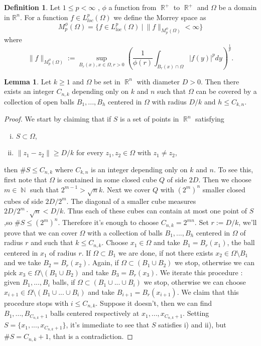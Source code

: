 \documentclass[12pt]{article}
\theoremstyle{definition}
\newtheorem{definition}{Definition}
\newtheorem{lemma}{Lemma}
\DeclareMathOperator\rr{\mathbb{R}}
\DeclareMathOperator\nn{\mathbb{N}}
\begin{document}
\begin{definition}
Let $1\le p< \infty$ , $\phi$ a function from $\rr^+$ to $\rr^+$ and $\Omega$ be a domain in $\mathbb{R}^n$. For a function $f \in L^p_{loc}(\Omega)$ we define the Morrey space as
\[ M_p^\phi(\Omega)=\{f \in  L^p_{loc}(\Omega) \ |\  \|f\|_{M_p^\phi(\Omega)}<\infty\}\]
where
\[ \|f\|_{M_p^\phi(\Omega)}:=\sup_{B_r(x), x \in \Omega,r>0} \left(  \frac{1}{\phi(r)}\int_{B_r(x)\cap \Omega} |f(y)|^p dy \right )^{\frac{1}{p}}.\]

\end{definition}
\begin{lemma}\label{covering}
Let $k\ge 1$ and $\Omega$ be set in $\rr^n$ with diameter $D>0$. Then there exists an integer $C_{n,k}$ depending only on $k$ and $n$ such that $\Omega$ can be covered by a collection of open balls $B_1,...,B_h$ centered in $\Omega$ with radius $D/k$ and $h \le C_{k,n}.$
\end{lemma}
\begin{proof}
We start by claiming that if $S$ is a set of points in $\rr^n$ satisfying
\begin{enumerate}[i)]
\item  	$S \subset \Omega$,
\item $\|z_1-z_2 \|\ge D/k$ for every $z_1,z_2 \in \Omega$ with $z_1 \neq z_2$,
\end{enumerate}
then $\#S\le C_{n,k}$ where $C_{k,n}$ is an integer depending only on $k$ and $n$. To see this, first note that $\Omega$ is contained in some closed cube $Q$ of side $2D$. Then we choose $m \in \nn$ such that $2^{m-1}>\sqrt n k$. Next we cover $Q$ with $(2^m)^n$ smaller closed cubes of side $2D/2^m$. The diagonal of a smaller cube measures $2D/2^m \cdot \sqrt n < D/k$. Thus each of these cubes can contain at most one point of $S$ ,so $\#S\le (2^m)^n.$ Therefore it's enough to choose $C_{n,k}=2^{mn}.$ Set $r:=D/k$, we'll prove that we can cover $\Omega$ with a collection of balls $B_1,...,B_h$ centered in $\Omega$ of radius $r$ and such that $k\le C_{n,k}.$ Choose $x_1 \in \Omega$ and take $B_1=B_r(x_1)$, the ball centered in $x_1$ of radius $r$. If $\Omega \subset B_1$ we are done, if not there exists $x_2 \in \Omega\setminus B_1$ and we take $B_2=B_r(x_2).$ Again, if $\Omega \subset (B_1\cup B_2)$ we stop, otherwise we can pick $x_3 \in  \Omega\setminus (B_1 \cup B_2)$ and take $B_3=B_r(x_3).$ We iterate this procedure : given $B_1,...,B_i$ balls, if $ \Omega \subset (B_1\cup...\cup B_i)$ we stop, otherwise we can choose $x_{i+1} \in  \Omega \setminus (B_1\cup...\cup B_i)$ and take $B_{i+1}=B_r(x_{i+1}).$ We claim that this procedure stops with $i\le C_{n,k}.$ Suppose it doesn't, then we can find $B_1,...,B_{C_{n,k}+1}$ balls centered respectively at $x_1,...,x_{C_{n,k}+1}$. Setting $S= \{x_1,...,x_{C_{n,k}+1} \}$, it's immediate to see that $S$ satisfies i) and ii), but $\#S=C_{n,k}+1$, that is a contradiction.
\end{proof}
\end{document}
